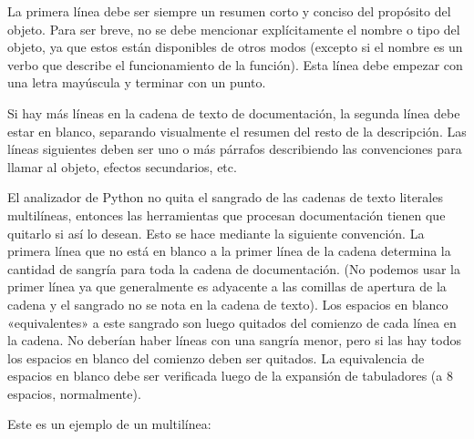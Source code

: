 \documentclass[a4,10pt,spanish]{sphinxmanual}
\begin{document}
\sphinxAtStartPar
La primera línea debe ser siempre un resumen corto y conciso del propósito del objeto. Para ser breve, no se debe mencionar explícitamente el nombre o tipo del objeto, ya que estos están disponibles de otros modos (excepto si el nombre es un verbo que describe el funcionamiento de la función). Esta línea debe empezar con una letra mayúscula y terminar con un punto.

\sphinxAtStartPar
Si hay más líneas en la cadena de texto de documentación, la segunda línea debe estar en blanco, separando visualmente el resumen del resto de la descripción. Las líneas siguientes deben ser uno o más párrafos describiendo las convenciones para llamar al objeto, efectos secundarios, etc.

\sphinxAtStartPar
El analizador de Python no quita el sangrado de las cadenas de texto literales multi\sphinxhyphen{}líneas, entonces las herramientas que procesan documentación tienen que quitarlo si así lo desean. Esto se hace mediante la siguiente convención. La primera línea que no está en blanco  a la primer línea de la cadena determina la cantidad de sangría para toda la cadena de documentación. (No podemos usar la primer línea ya que generalmente es adyacente a las comillas de apertura de la cadena y el sangrado no se nota en la cadena de texto). Los espacios en blanco «equivalentes» a este sangrado son luego quitados del comienzo de cada línea en la cadena. No deberían haber líneas con una sangría menor, pero si las hay todos los espacios en blanco del comienzo deben ser quitados. La equivalencia de espacios en blanco debe ser verificada luego de la expansión de tabuladores (a 8 espacios, normalmente).

\sphinxAtStartPar
Este es un ejemplo de un  multi\sphinxhyphen{}línea:

\begin{sphinxVerbatim}[commandchars=\\\{\}]
 
    
    

\end{sphinxVerbatim}
\end{document}
